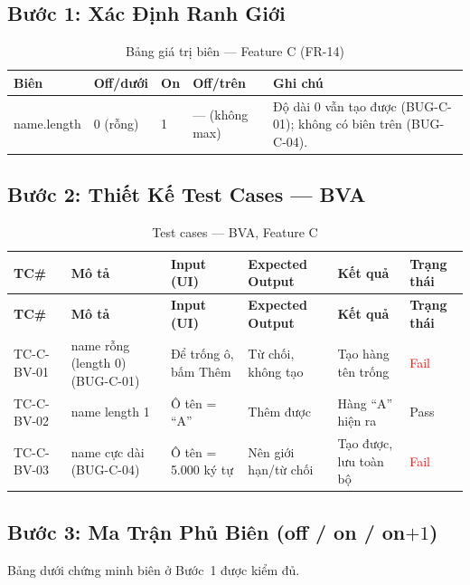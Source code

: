 \documentclass[12pt, a4paper]{report}
\begin{document}
\subsection{Bước 1: Xác Định Ranh Giới}
\begin{table}[H]
    \centering
    \caption{Bảng giá trị biên — Feature C (FR-14)}
    \begin{tabularx}{\linewidth}{L{3.2cm} C{1.8cm} C{1.8cm} C{2cm} X}
        \toprule
        \textbf{Biên} & \textbf{Off/dưới} & \textbf{On} & \textbf{Off/trên} & \textbf{Ghi chú} \\
        \midrule
        name.length & 0 (rỗng) & 1 & --- (không max) & Độ dài 0 vẫn tạo được (BUG-C-01); không có biên trên (BUG-C-04). \\
        \bottomrule
    \end{tabularx}
\end{table}

\subsection{Bước 2: Thiết Kế Test Cases — BVA}
\begin{longtable}{C{1.2cm} L{3.2cm} L{3.1cm} L{3cm} C{1.9cm} C{1.4cm}}
    \caption{Test cases — BVA, Feature C} \\
    \toprule
    \textbf{TC\#} & \textbf{Mô tả} & \textbf{Input (UI)} & \textbf{Expected Output} & \textbf{Kết quả} & \textbf{Trạng thái} \\
    \midrule
    \endfirsthead
    \toprule
    \textbf{TC\#} & \textbf{Mô tả} & \textbf{Input (UI)} & \textbf{Expected Output} & \textbf{Kết quả} & \textbf{Trạng thái} \\
    \midrule
    \endhead
    \bottomrule
    \endlastfoot
    TC-C-BV-01 & name rỗng (length 0) \newline (BUG-C-01) & Để trống ô, bấm Thêm & Từ chối, không tạo & Tạo hàng tên trống & \textcolor{red}{Fail} \\
    TC-C-BV-02 & name length 1 & Ô tên = ``A'' & Thêm được & Hàng ``A'' hiện ra & \textcolor{green!60!black}{Pass} \\
    TC-C-BV-03 & name cực dài \newline (BUG-C-04) & Ô tên = 5.000 ký tự & Nên giới hạn/từ chối & Tạo được, lưu toàn bộ & \textcolor{red}{Fail} \\
\end{longtable}

\subsection{Bước 3: Ma Trận Phủ Biên (off / on / on$+1$)}
Bảng dưới chứng minh biên ở Bước~1 được kiểm đủ.
\end{document}
